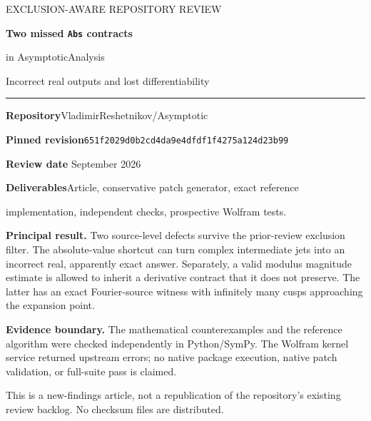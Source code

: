 \documentclass[11pt,a4paper]{article}
\newcommand{\revision}{\texttt{651f2029d0b2cd4da9e4dfdf1f4275a124d23b99}}
\begin{document}
\begin{titlepage}
\vspace*{12mm}
{\color{muted}\large EXCLUSION-AWARE REPOSITORY REVIEW\par}
\vspace{12mm}
{\color{ink}\Huge\bfseries Two missed \texttt{Abs} contracts\par}
\vspace{4mm}
{\color{ink}\LARGE in AsymptoticAnalysis\par}
\vspace{9mm}
{\Large Incorrect real outputs and lost differentiability\par}
\vspace{12mm}
\rule{\textwidth}{0.7pt}
\vspace{5mm}
\textbf{Repository}\quad VladimirReshetnikov/Asymptotic\par
\textbf{Pinned revision}\quad\revision\par
\textbf{Review date} September 2026\par
\textbf{Deliverables}\quad Article, conservative patch generator, exact reference\par
\hspace*{28mm}implementation, independent checks, prospective Wolfram tests.\par
\vspace{8mm}
\begin{minipage}{0.94\textwidth}
\textbf{Principal result.} Two source-level defects survive the prior-review exclusion filter. The absolute-value shortcut can turn complex intermediate jets into an incorrect real, apparently exact answer. Separately, a valid modulus magnitude estimate is allowed to inherit a derivative contract that it does not preserve. The latter has an exact Fourier-source witness with infinitely many cusps approaching the expansion point.

\textbf{Evidence boundary.} The mathematical counterexamples and the reference algorithm were checked independently in Python/SymPy. The Wolfram kernel service returned upstream errors; no native package execution, native patch validation, or full-suite pass is claimed.
\end{minipage}
\vfill
{\color{muted}This is a new-findings article, not a republication of the repository's existing review backlog. No checksum files are distributed.\par}
\end{titlepage}
\begingroup
\small
\setlength{\parskip}{0pt}
\tableofcontents
\endgroup
\newpage
\end{document}
